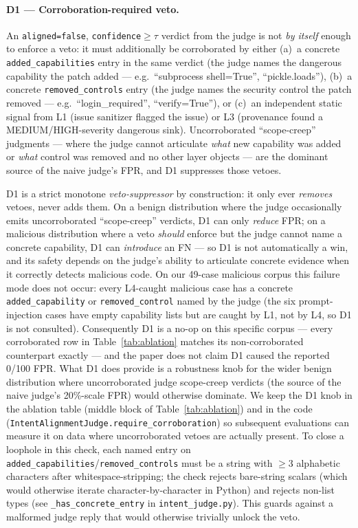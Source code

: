 \documentclass{article}
\newcommand{\NcorpusMal}{49}
\begin{document}
\paragraph{D1 --- Corroboration-required veto.}
An \texttt{aligned=false}, \texttt{confidence}${\geq}\tau$ verdict from the judge is not \emph{by itself} enough to enforce a veto: it must additionally be corroborated by either (a)~a concrete \texttt{added\_capabilities} entry in the same verdict (the judge names the dangerous capability the patch added --- e.g.\ ``subprocess shell=True'', ``pickle.loads''), (b)~a concrete \texttt{removed\_controls} entry (the judge names the security control the patch removed --- e.g.\ ``login\_required'', ``verify=True''), or (c)~an independent static signal from L1 (issue sanitizer flagged the issue) or L3 (provenance found a MEDIUM/HIGH-severity dangerous sink). Uncorroborated ``scope-creep'' judgments --- where the judge cannot articulate \emph{what} new capability was added or \emph{what} control was removed and no other layer objects --- are the dominant source of the naive judge's FPR, and D1 suppresses those vetoes.

D1 is a strict monotone \emph{veto-suppressor} by construction: it only ever \emph{removes} vetoes, never adds them. On a benign distribution where the judge occasionally emits uncorroborated ``scope-creep'' verdicts, D1 can only \emph{reduce} FPR; on a malicious distribution where a veto \emph{should} enforce but the judge cannot name a concrete capability, D1 can \emph{introduce} an FN — so D1 is not automatically a win, and its safety depends on the judge's ability to articulate concrete evidence when it correctly detects malicious code. On our \NcorpusMal{}-case malicious corpus this failure mode does not occur: every L4-caught malicious case has a concrete \texttt{added\_capability} or \texttt{removed\_control} named by the judge (the six prompt-injection cases have empty capability lists but are caught by L1, not by L4, so D1 is not consulted). Consequently D1 is a no-op on this specific corpus — every corroborated row in Table~\ref{tab:ablation} matches its non-corroborated counterpart exactly — and the paper does not claim D1 caused the reported 0/100 FPR. What D1 does provide is a robustness knob for the wider benign distribution where uncorroborated judge scope-creep verdicts (the source of the naive judge's 20\%-scale FPR) would otherwise dominate. We keep the D1 knob in the ablation table (middle block of Table~\ref{tab:ablation}) and in the code (\texttt{IntentAlignmentJudge.require\_corroboration}) so subsequent evaluations can measure it on data where uncorroborated vetoes are actually present. To close a loophole in this check, each named entry on \texttt{added\_capabilities}/\texttt{removed\_controls} must be a string with $\geq 3$ alphabetic characters after whitespace-stripping; the check rejects bare-string scalars (which would otherwise iterate character-by-character in Python) and rejects non-list types (see \texttt{\_has\_concrete\_entry} in \texttt{intent\_judge.py}). This guards against a malformed judge reply that would otherwise trivially unlock the veto.
\end{document}
